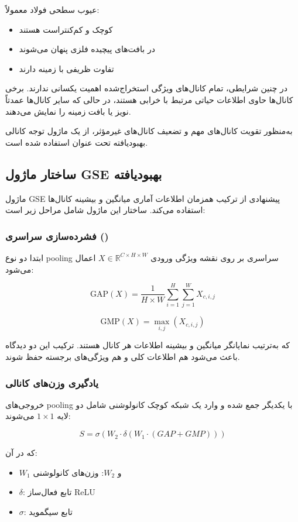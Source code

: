 \documentclass[a4paper, 10pt, twocolumn]{article}
\begin{document}
	عیوب سطحی فولاد معمولاً:
	\begin{itemize}
		\item کوچک و کم‌کنتراست هستند
		\item در بافت‌های پیچیده فلزی پنهان می‌شوند
		\item تفاوت ظریفی با زمینه دارند
	\end{itemize}
	
	در چنین شرایطی، تمام کانال‌های ویژگی استخراج‌شده اهمیت یکسانی ندارند. برخی کانال‌ها حاوی اطلاعات حیاتی مرتبط با خرابی هستند، در حالی که سایر کانال‌ها عمدتاً نویز یا بافت زمینه را نمایش می‌دهند.  
	
	به‌منظور تقویت کانال‌های مهم و تضعیف کانال‌های غیرمؤثر، از یک ماژول توجه کانالی بهبودیافته تحت عنوان  استفاده شده است.
	
	\subsection{ساختار ماژول GSE بهبودیافته}
	
	ماژول GSE پیشنهادی از ترکیب همزمان اطلاعات آماری میانگین و بیشینه کانال‌ها استفاده می‌کند. ساختار این ماژول شامل مراحل زیر است:
	
	\subsubsection{فشرده‌سازی سراسری ()}
	
	ابتدا دو نوع pooling سراسری بر روی نقشه ویژگی ورودی \(X \in \mathbb{R}^{C \times H \times W}\) اعمال می‌شود:
	
	\[
	\text{GAP}(X) = \frac{1}{H \times W} \sum_{i=1}^{H} \sum_{j=1}^{W} X_{c,i,j}
	\]
	
	\[
	\text{GMP}(X) = \max_{i,j}(X_{c,i,j})
	\]
	
	که به‌ترتیب نمایانگر میانگین و بیشینه اطلاعات هر کانال هستند. ترکیب این دو دیدگاه باعث می‌شود هم اطلاعات کلی و هم ویژگی‌های برجسته حفظ شوند.
	
	\subsubsection{یادگیری وزن‌های کانالی}
	
	خروجی‌های pooling با یکدیگر جمع شده و وارد یک شبکه کوچک کانولوشنی شامل دو لایه \(1 \times 1\) می‌شوند:
	
	\[
	S = \sigma(W_2 \cdot \delta(W_1 \cdot (GAP + GMP)))
	\]
	
	که در آن:
	\begin{itemize}
		\item \(W_1\) و \(W_2\): وزن‌های کانولوشنی
		\item \(\delta\): تابع فعال‌ساز ReLU
		\item \(\sigma\): تابع سیگموید
	\end{itemize}
	
\end{document}
